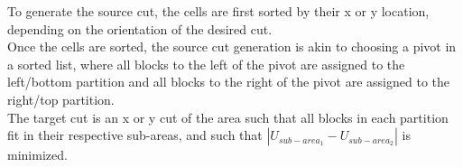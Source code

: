 \documentclass[twocolumn]{article}
\begin{document}
\begin{itemize}
            To generate the source cut, the cells are first sorted by their x or y location, depending on the orientation of the desired cut. \\
            Once the cells are sorted, the source cut generation is akin to choosing a pivot in a sorted list, where all blocks to the left of the pivot are assigned to the left/bottom partition and all blocks to the right of the pivot are assigned to the right/top partition. \\
            The target cut is an x or y cut of the area such that all blocks in each partition fit in their respective sub-areas, and such that \( | U_{sub-area_1} 
             - U_{sub-area_2} | \) is minimized.




    \end{itemize}
\end{document}
